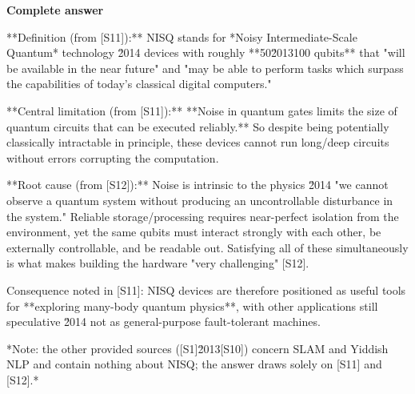 \documentclass[10pt]{article}
\begin{document}
\textbf{Complete answer}
\begin{AnswerText}
**Definition (from [S11]):** NISQ stands for *Noisy Intermediate-Scale Quantum* technology \u2014 devices with roughly **50\u2013100 qubits** that "will be available in the near future" and "may be able to perform tasks which surpass the capabilities of today's classical digital computers."

**Central limitation (from [S11]):** **Noise in quantum gates limits the size of quantum circuits that can be executed reliably.** So despite being potentially classically intractable in principle, these devices cannot run long/deep circuits without errors corrupting the computation.

**Root cause (from [S12]):** Noise is intrinsic to the physics \u2014 "we cannot observe a quantum system without producing an uncontrollable disturbance in the system." Reliable storage/processing requires near-perfect isolation from the environment, yet the same qubits must interact strongly with each other, be externally controllable, and be readable out. Satisfying all of these simultaneously is what makes building the hardware "very challenging" [S12].

Consequence noted in [S11]: NISQ devices are therefore positioned as useful tools for **exploring many-body quantum physics**, with other applications still speculative \u2014 not as general-purpose fault-tolerant machines.

*Note: the other provided sources ([S1]\u2013[S10]) concern SLAM and Yiddish NLP and contain nothing about NISQ; the answer draws solely on [S11] and [S12].*
\end{AnswerText}
\end{document}
